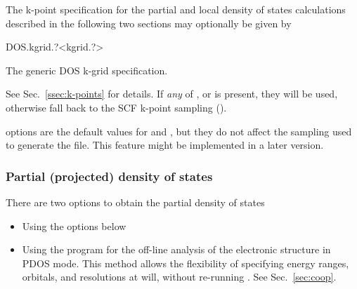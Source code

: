 The k-point specification for the partial and local density of states
calculations described in the following two sections may optionally be
given by 

\begin{fdfentry}{DOS.kgrid.?}<kgrid.?>

  The generic DOS k-grid specification.

  See Sec.~\ref{ssec:k-points} for details. If \emph{any} of
  ,  or
   is present, they will be used, otherwise fall
  back to the SCF k-point sampling ().

  \note {} options are the default values for
   and , but
  they do not affect the sampling used to generate the 
  file. This feature might be implemented in a later version.

\end{fdfentry}


\subsubsection{Partial (projected) density of states}

There are two options to obtain the partial density of states
\begin{itemize}
  
  \item Using the options below
  
  \item Using the  program for the off-line analysis of
  the electronic structure in PDOS mode. This method allows the
  flexibility of specifying energy ranges, orbitals, and resolutions
  at will, without re-running \siesta. See Sec.~\ref{sec:coop}.
  
\end{itemize}

